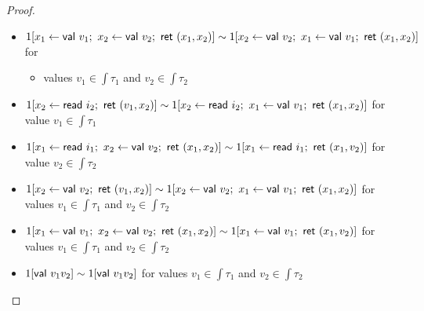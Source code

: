 \begin{proof}
\begin{itemize}
\begin{itemize}
\item $1[x_1 \leftarrow \mathsf{val} \ v_1; \ x_2 \leftarrow \mathsf{val} \ v_2; \ \mathsf{ret} \ (x_1,x_2)] \sim 1[x_2 \leftarrow \mathsf{val} \ v_2; \ x_1 \leftarrow \mathsf{val} \ v_1; \ \mathsf{ret} \ (x_1,x_2)]$ for
\begin{itemize}
\item values $v_1 \in \int{\tau_1}$ and $v_2 \in \int{\tau_2}$
\end{itemize}
\item $1[x_2 \leftarrow \read{i_2}; \ \ret{(v_1,x_2)}] \sim 1[x_2 \leftarrow \read{i_2}; \ x_1 \leftarrow \val{v_1}; \ \ret{(x_1,x_2)}]$ for value $v_1 \in \int{\tau_1}$
\item $1[x_1 \leftarrow \mathsf{read} \ i_1; \ x_2 \leftarrow \mathsf{val} \ v_2; \ \mathsf{ret} \ (x_1,x_2)] \sim 1[x_1 \leftarrow \mathsf{read} \ i_1; \ \mathsf{ret} \ (x_1,v_2)]$ for value $v_2 \in \int{\tau_2}$
\item $1[x_2 \leftarrow \val{v_2}; \ \ret{(v_1,x_2)}] \sim 1[x_2 \leftarrow \val{v_2}; \ x_1 \leftarrow \val{v_1}; \ \ret{(x_1,x_2)}]$ for values $v_1 \in \int{\tau_1}$ and $v_2 \in \int{\tau_2}$
\item $1[x_1 \leftarrow \mathsf{val} \ v_1; \ x_2 \leftarrow \mathsf{val} \ v_2; \ \mathsf{ret} \ (x_1,x_2)] \sim 1[x_1 \leftarrow \mathsf{val} \ v_1; \ \mathsf{ret} \ (x_1,v_2)]$ for
values $v_1 \in \int{\tau_1}$ and $v_2 \in \int{\tau_2}$
\item $1[\mathsf{val} \ v_1 v_2] \sim 1[\mathsf{val} \ v_1 v_2]$ for values $v_1 \in \int{\tau_1}$ and $v_2 \in \int{\tau_2}$
\end{itemize}
\end{itemize}
\end{proof}

